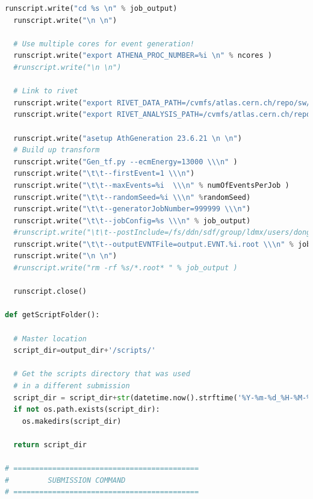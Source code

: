 \documentclass[NOTE, REPORT=true, atlasdraft=true, USenglish]{atlasdoc}
\begin{document}
\begin{lstlisting}[language=Python, caption=Job Configuration python script]
  runscript.write("cd %s \n" % job_output)
  runscript.write("\n \n")

  # Use multiple cores for event generation!
  runscript.write("export ATHENA_PROC_NUMBER=%i \n" % ncores )
  #runscript.write("\n \n")

  # Link to rivet
  runscript.write("export RIVET_DATA_PATH=/cvmfs/atlas.cern.ch/repo/sw/software/23.6/sw/lcg/releases/MCGenerators/rivet/4.0.0-39772/x86_64-centos7-gcc11-opt/share/Rivet:/fs/ddn/sdf/group/ldmx/users/dongyi/data/key_files/data_samples/CMS_2022_I2129461 \n")
  runscript.write("export RIVET_ANALYSIS_PATH=/cvmfs/atlas.cern.ch/repo/sw/software/23.6/sw/lcg/releases/MCGenerators/rivet/4.0.0-39772/x86_64-centos7-gcc11-opt/lib/Rivet:/fs/ddn/sdf/group/ldmx/users/dongyi/data/NWF:/fs/ddn/sdf/group/ldmx/users/dongyi/data/key_files/data_samples/CMS_2022_I2129461/ \n")

  runscript.write("asetup AthGeneration 23.6.21 \n \n")
  # Build up transform
  runscript.write("Gen_tf.py --ecmEnergy=13000 \\\n" )
  runscript.write("\t\t--firstEvent=1 \\\n")
  runscript.write("\t\t--maxEvents=%i  \\\n" % numOfEventsPerJob )
  runscript.write("\t\t--randomSeed=%i \\\n" %randomSeed)
  runscript.write("\t\t--generatorJobNumber=999999 \\\n")
  runscript.write("\t\t--jobConfig=%s \\\n" % job_output)
  #runscript.write("\t\t--postInclude=/fs/ddn/sdf/group/ldmx/users/dongyi/data/BATCH/JO.py \\\n")
  runscript.write("\t\t--outputEVNTFile=output.EVNT.%i.root \\\n" % job_index )
  runscript.write("\n \n")
  #runscript.write("rm -rf %s/*.root* " % job_output )

  runscript.close()

def getScriptFolder():

  # Master location
  script_dir=output_dir+'/scripts/'

  # Get the scripts directory that was used
  # in a different submission
  script_dir = script_dir+str(datetime.now().strftime('%Y-%m-%d_%H-%M-%S'))
  if not os.path.exists(script_dir):
    os.makedirs(script_dir)

  return script_dir

# ===========================================
#         SUBMISSION COMMAND
# ===========================================


\end{lstlisting}
\end{document}
